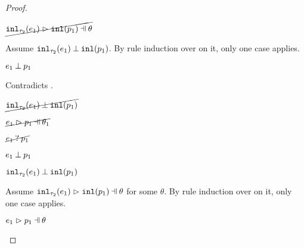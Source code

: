 \begin{proof}
\begin{byCases}
\begin{byCases}
\begin{byCases}
\begin{byCases}
            \end{byCases}
            \begin{pfsteps*}
            \item $\cancel{\hpatmatch{\hinl{\tau_2}{e_1}}{\hinlp{p_1}}{\theta}}$ 
            \end{pfsteps*}
            Assume $\mathtt{inl}_{\tau_2}({e_1}) \mathbin{\bot} \mathtt{inl}(p_1)$. By rule induction over  on it, only one case applies.
            \begin{byCases}
            \item[\text{(\ref{rule:NMInl})}]
                \begin{pfsteps*}
                \item $e_1 \mathbin{\bot} p_1$ 
                \end{pfsteps*}
                Contradicts .
            \end{byCases}
            \begin{pfsteps*}
            \item $\cancel{\mathtt{inl}_{\tau_2}({e_1}) \mathbin{\bot} \mathtt{inl}(p_1)}$ 
            \end{pfsteps*}
        \item[\hnotmatch{e_1}{p_1}]
            \begin{pfsteps*}
            \item $\cancel{\hpatmatch{e_1}{p_1}{\theta_1}}$  
            \item $\cancel{e_1 \mathbin{?} p_1}$  
            \item $e_1 \mathbin{\bot} p_1$  
            \item $\mathtt{inl}_{\tau_2}({e_1}) \mathbin{\bot} \mathtt{inl}(p_1)$ 
            \end{pfsteps*}
            Assume $\hpatmatch{\hinl{\tau_2}{e_1}}{\hinlp{p_1}}{\theta}$ for some $\theta$. By rule induction over  on it, only one case applies.
            \begin{byCases}
            \item[\text{(\ref{rule:MInl})}]
                \begin{pfsteps*}
                \item $\hpatmatch{e_1}{p_1}{\theta}$ 
                \end{pfsteps*}

\end{byCases}
\end{byCases}
\end{byCases}
\end{byCases}
\end{proof}
